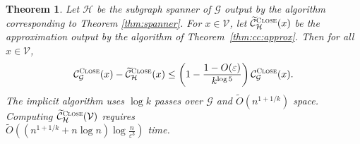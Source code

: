 \documentclass[10]{report}
\newtheorem{theorem}{Theorem}[section]
\newcommand{\algoname}[1]{\textnormal{\textsc{#1}}}
\begin{document}
%
\begin{theorem} \label{thm:cc:sstream:approx:light}
Let $\mathcal{H}$ be the subgraph spanner of $\mathcal{G}$ output by the algorithm corresponding to Theorem \ref{thm:spanner}.
For $x \in \mathcal{V}$, let $\widetilde{\mathcal{C}}^{\algoname{Close}}_{\mathcal{H}}(x)$ be the approximation output by the algorithm of Theorem~\ref{thm:cc:approx}. 
Then for all $x \in \mathcal{V}$,
%
\begin{equation} \label{eq:spanner:cc:light}
\mathcal{C}^{\algoname{Close}}_{\mathcal{G}}(x) - \widetilde{\mathcal{C}}^{\algoname{Close}}_{\mathcal{H}}(x) \leq \left ( 1 - \frac{1 - O(\varepsilon)}{k^{\log 5}} \right ) \mathcal{C}^{\algoname{Close}}_{\mathcal{G}}(x).
\end{equation}
%
The implicit algorithm uses $\log k$ passes over $\mathcal{G}$ and $\widetilde{O}(n^{1 + 1/k})$ space.
Computing $\widetilde{\mathcal{C}}^{\algoname{Close}}_{\mathcal{H}}(\mathcal{V})$ requires \\
$\widetilde{O} \left ( \left (n^{1 + 1/k} + n \log n \right )\log \frac{n}{\varepsilon^3} \right )$ time.
\end{theorem}

 
\end{document}
